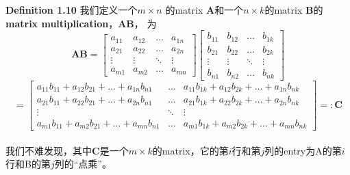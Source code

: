 \documentclass{report}
\def\defb{\begin{tcolorbox} [colback=yellow!20, colframe=orange!80, sharp corners, leftrule={5pt}, rightrule={0pt}, toprule={0pt}, bottomrule={0pt}, left={2pt}, right={2pt}, top={3pt}, bottom={3pt}]}
\def\defe{\end{tcolorbox}}
\begin{document}
\defb 
	\textbf{Definition 1.10}
	我们定义一个$ m \times n $ 的matrix \textbf{A}和一个$ n \times k $的matrix \textbf{B}的\textbf{matrix multiplication}，$ \mathbf{AB} $， 为
	$$ \mathbf{AB} =
	 \left[ \begin{matrix}
		a_{11} & a_{12} & \dots & a_{1n} \\
		a_{21} & a_{22} & \dots & a_{2n} \\
		\vdots & \vdots & \ddots & \vdots \\
		a_{m1} & a_{m2} & \dots & a_{mn}
	\end{matrix}\right]
	\left[ \begin{matrix}
		b_{11} & b_{12} & \dots & b_{1k} \\
		b_{21} & b_{22} & \dots & b_{2k} \\
		\vdots & \vdots & \ddots & \vdots \\
		b_{n1} & b_{n2} & \dots & b_{nk}
	\end{matrix}\right]$$
	$$=
	\left[ \begin{matrix}
		a_{11}b_{11} + a_{12}b_{21} + \dots + a_{1n}b_{n1} & \dots & a_{11}b_{1k} + a_{12}b_{2k} + \dots + a_{1n}b_{nk} \\
		a_{21}b_{11} + a_{22}b_{21} + \dots + a_{2n}b_{n1} & \dots & a_{21}b_{1k} + a_{22}b_{2k} + \dots + a_{2n}b_{nk} \\
		\vdots  & \ddots & \vdots \\
		a_{m1}b_{11} + a_{m2}b_{21} + \dots + a_{mn}b_{n1} & \dots & a_{m1}b_{1k} + a_{m2}b_{2k} + \dots + a_{mn}b_{nk}
	\end{matrix}\right]
	=: \mathbf{C}
	$$
	\\

	我们不难发现，其中$ \mathbf{C} $是一个$ m \times k $的matrix，它的第$i$行和第$j$列的entry为A的第$i$行和B的第$j$列的“点乘”。

\defe 
\end{document}

